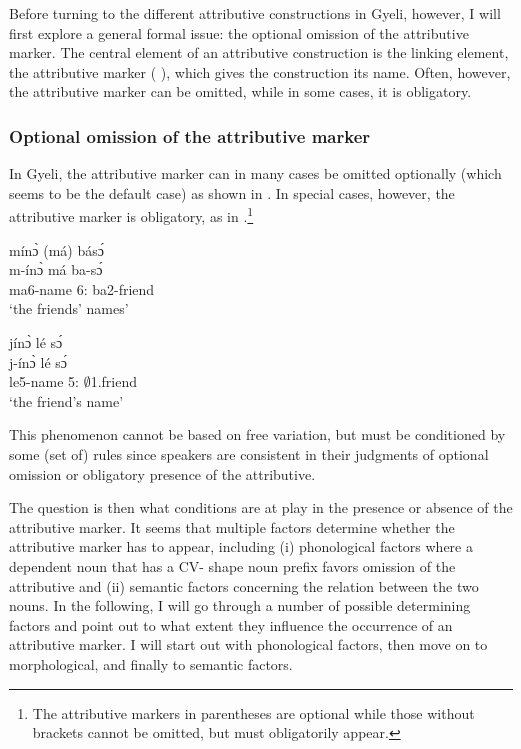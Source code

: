 Before turning to the different attributive constructions in Gyeli, however, I will first explore a general formal issue: the optional omission of the attributive marker. The central element of an attributive construction is the linking element, the attributive marker ( ), which gives the construction its name. Often, however, the attributive marker can be omitted, while in some cases, it is obligatory. 


\subsubsection{Optional omission of the attributive marker}
\label{sec:CONOM}

 In Gyeli, the attributive marker can in many cases be omitted optionally (which seems to be the default case) as shown in . In special cases, however, the attributive marker is obligatory, as in .\footnote{The attributive markers in parentheses are optional while those without brackets cannot be omitted, but must obligatorily appear.}

\ea\label{mino}
  \glll     mínɔ̀ (má) básɔ́ \\
  m-ínɔ̀ má ba-sɔ́ \\
              ma6-name 6:{\ATT}  ba2-friend\\
    \trans `the friends' names'
\z

\ea\label{djino}
  \glll    jínɔ̀ lé sɔ́ \\
          j-ínɔ̀ lé sɔ́ \\
              le5-name 5:{\ATT}  $\emptyset$1.friend\\
    \trans `the friend's name'
\z

\noindent This phenomenon cannot be based on free variation, but must be conditioned by some (set of) rules since speakers are consistent in their judgments of optional omission or obligatory presence of the attributive.

The question is then what conditions are at play in the presence or absence of the attributive marker. It seems that multiple factors determine whether the attributive marker has to appear, including (i) phonological factors where a dependent noun that has a CV- shape noun prefix favors omission of the attributive and (ii) semantic factors concerning the relation between the two nouns. In the following, I will go through a number of possible determining factors and point out to what extent they  influence the occurrence of an attributive marker. I will start out with phonological factors, then move on to morphological, and finally to semantic factors.



